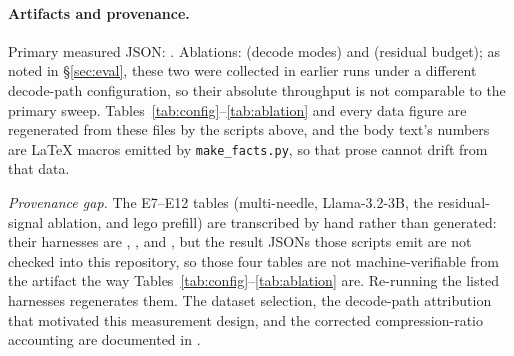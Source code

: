 \begin{sloppypar}
\paragraph{Artifacts and provenance.}
Primary measured JSON: .
Ablations:  (decode modes) and
 (residual budget); as noted in
\S\ref{sec:eval}, these two were collected in earlier runs under a different
decode-path configuration, so their absolute throughput is not comparable to the
primary sweep. Tables~\ref{tab:config}--\ref{tab:ablation} and every data figure
are regenerated from these files by the scripts above, and the body text's numbers
are LaTeX macros emitted by \texttt{make\_facts.py}, so that prose cannot drift
from that data.

\emph{Provenance gap.} The E7--E12 tables (multi-needle, Llama-3.2-3B, the residual-signal
ablation, and lego prefill) are transcribed by hand rather than generated: their harnesses are
, ,
 and , but the result JSONs those
scripts emit are not checked into this repository, so those four tables are not machine-verifiable
from the artifact the way Tables~\ref{tab:config}--\ref{tab:ablation} are. Re-running the listed
harnesses regenerates them. The dataset selection, the decode-path attribution that motivated this
measurement design, and the corrected compression-ratio accounting are documented in
.
\end{sloppypar}
